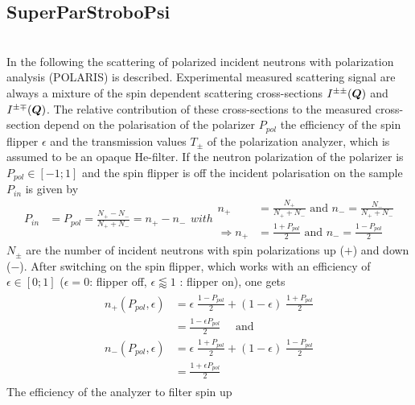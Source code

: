 
\clearpage
\subsection{SuperParStroboPsi}  ~\\

In the following the scattering of polarized incident neutrons with polarization analysis (POLARIS) is described.
Experimental measured scattering signal are always a mixture of the spin dependent scattering cross-sections
$I^{\pm\pm}(\BM{Q})$ and $I^{\pm\mp}(\BM{Q})$. The relative contribution of these cross-sections to the measured cross-section
depend on the polarisation of the polarizer $P_{pol}$ the efficiency of the spin flipper $\epsilon$ and the
transmission values $T_\pm$ of the polarization analyzer, which is assumed to be an opaque He-filter.
If the neutron polarization of the polarizer is $P_{pol}\in [-1;1]$ and the spin flipper is off the incident
polarisation on the sample $P_{in}$ is given by
\begin{subequations}
\begin{align}
P_{in} &= P_{pol}= \frac{N_+-N_-}{N_++N_-}=n_+-n_-
\end{align}
with
\begin{align}
n_+&=\frac{N_+}{N_++N_-} \text{ and } n_- =\frac{N_-}{N_++N_-} \\
\Rightarrow n_+ &= \frac{1+P_{pol}}{2} \text{ and } n_- =\frac{1-P_{pol}}{2}
\end{align}
\end{subequations}
$N_\pm$ are the number of incident neutrons with spin polarizations up ($+$) and down ($-$).
After switching on the spin flipper, which works with an efficiency of $\epsilon \in [0;1]$
($\epsilon=0$: flipper off, $\epsilon\lessapprox 1$ : flipper on), one gets
\begin{align}
\begin{split}
n_+(P_{pol},\epsilon) &= \epsilon \;
\frac{1-P_{pol}}{2}+(1-\epsilon) \; \frac{1+P_{pol}}{2} \nonumber \\
&= \frac{1-\epsilon P_{pol}}{2}\quad \text{ and } \\
n_-(P_{pol},\epsilon) &= \epsilon \;
\frac{1+P_{pol}}{2}+(1-\epsilon) \; \frac{1-P_{pol}}{2} \nonumber \\
&= \frac{1+\epsilon P_{pol}}{2}
\end{split}
\end{align}
The efficiency of the analyzer to filter spin up
